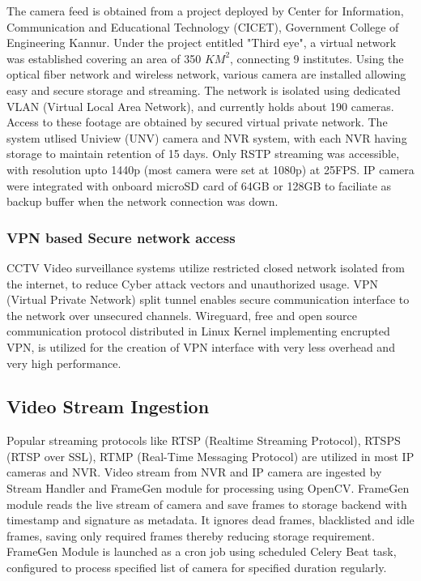 The camera feed is obtained from a project deployed by Center for Information, Communication and Educational Technology (CICET), Government College of Engineering Kannur. Under the project entitled "Third eye", a virtual network was established covering an area of 350 $KM^2$, connecting 9 institutes. Using the optical fiber network and wireless network, various camera are installed allowing easy and secure storage and streaming. The network is isolated using dedicated VLAN (Virtual Local Area Network), and currently holds about 190 cameras. Access to these footage are obtained by secured virtual private network. 
The system utlised Uniview (UNV) camera and NVR system, with each NVR having storage to maintain retention of 15 days. Only RSTP streaming was accessible, with resolution upto 1440p (most camera were set at 1080p) at 25FPS. IP camera were integrated with onboard microSD card of 64GB or 128GB to faciliate as backup buffer when the network connection was down.


\subsubsection{VPN based Secure network access}
CCTV Video surveillance systems utilize restricted closed network isolated from the internet, to reduce Cyber attack vectors and unauthorized usage.  VPN (Virtual Private Network) split tunnel enables secure communication interface to the network over unsecured channels. Wireguard, free and open source communication protocol distributed in Linux Kernel implementing encrupted VPN, is utilized for the creation of VPN interface with very less overhead and very high performance. 

\subsection{Video Stream Ingestion}
Popular streaming protocols like RTSP (Realtime Streaming Protocol), RTSPS (RTSP over SSL), RTMP (Real-Time Messaging Protocol) are utilized in most IP cameras and NVR. 
Video stream from NVR and IP camera are ingested by Stream Handler and FrameGen module for processing using OpenCV. FrameGen module reads the live stream of camera and save frames to storage backend with timestamp and signature as metadata. It ignores dead frames, blacklisted and idle frames, saving only required frames thereby reducing storage requirement. FrameGen Module is launched as a cron job using scheduled Celery Beat task, configured to process specified list of camera for specified duration regularly. 

